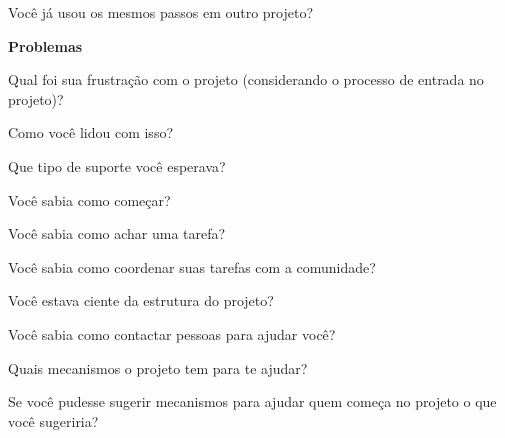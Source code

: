 \begin{anexosenv}
Você já usou os mesmos passos em outro projeto?

\textbf{Problemas}


Qual foi sua frustração com o projeto (considerando o processo de entrada no projeto)?

Como você lidou com isso?

Que tipo de suporte você esperava?

Você sabia como começar?

Você sabia como achar uma tarefa?

Você sabia como coordenar suas tarefas com a comunidade?

Você estava ciente da estrutura do projeto?

Você sabia como contactar pessoas para ajudar você?

Quais mecanismos o projeto tem para te ajudar?

Se você pudesse sugerir mecanismos para ajudar quem começa no projeto o que você sugeriria?

\end{anexosenv}

